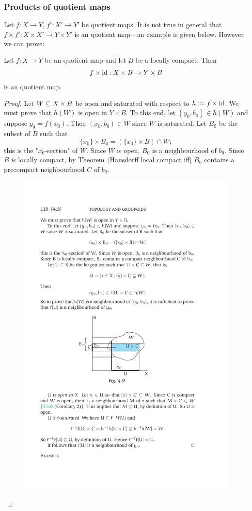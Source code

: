 \subsubsection{Products of quotient maps}
Let $f:X\to Y$, $f':X'\to Y'$ be quotient maps. It is not true in general that $f\times f':X\times X'\to Y\times Y'$ is an quotient map---an example is 
given below. However we can prove:
\begin{theorem}\label{quotient product}
Let $f:X\to Y$ be an quotient map and let $B$ be a locally compact. Then
\[f\times\mathrm{id}:X\times B\to Y\times B\]
is an quotient map.
\end{theorem}
\begin{proof}
Let $W\subseteq X\times B$ be open and saturated with respect to $h:=f\times\mathrm{id}$. We must prove that $h(W)$ is open in $Y\times B$. To this end, let $(y_0,b_0)\in h(W)$ and 
suppose $y_0=f(x_0)$. Then $(x_0,b_0)\in W$ since $W$ is saturated. Let $B_0$ be the subset of $B$ such that
\[\{x_0\}\times B_0=(\{x_0\}\times B)\cap W;\]
this is the "$x_0$-section" of $W$. Since $W$ is open, $B_0$ is a neighbourhood of $b_0$. Since $B$ is locally compact, by Theorem~\ref{Hausdorff local compact iff} 
$B_0$ contains a precompact neighbourhood $C$ of $b_0$.
\begin{figure}[htbp]
\centering
\includegraphics{quotient-product}
\end{figure}


\end{proof}
